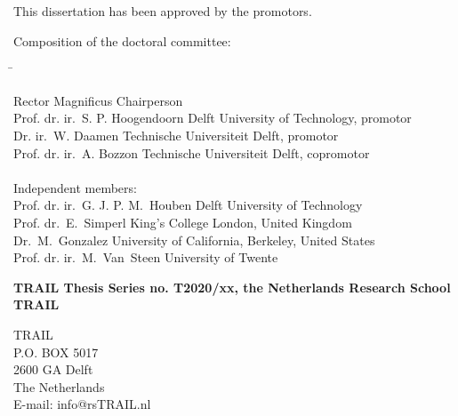 \begin{small}

\noindent This dissertation has been approved by the promotors.\\
\bigskip{}

\noindent Composition of the doctoral committee:
\noindent \begin{flushleft}\begin{tabbing}
\hspace*{70mm}\=\kill

Rector Magnificus \> Chairperson\\
Prof. dr. ir.\ S. P. Hoogendoorn \> Delft University of Technology, promotor\\
Dr. ir.\ W. Daamen \> Technische Universiteit Delft, promotor\\
Prof. dr. ir.\ A. Bozzon \> Technische Universiteit Delft, copromotor\\
\bigskip{}\\

\noindent Independent members:\\
Prof. dr. ir.\ G. J. P. M.\ Houben \> Delft University of Technology\\
Prof. dr.\ E.\ Simperl \> King's College London, United Kingdom\\
Dr.\ M.\ Gonzalez \> University of California, Berkeley, United States\\
Prof. dr. ir.\ M.\ Van\ Steen \> University of Twente\\
\end{tabbing}\end{flushleft}

\vspace*{\fill}


\bigskip{}
\noindent\textbf{TRAIL Thesis Series no. T2020/xx, the Netherlands Research School TRAIL}\\
\smallskip{}

\noindent TRAIL\\
P.O. BOX 5017\\
2600 GA Delft\\
The Netherlands\\
E-mail: info@rsTRAIL.nl\\
\bigskip{}


\end{small}
